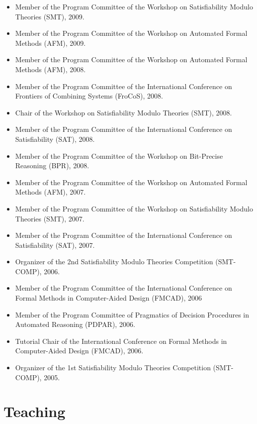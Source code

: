 \documentclass{article}
\begin{document}
\begin{itemize}
\item Member of the Program Committee of the Workshop on Satisfiability Modulo Theories (SMT), 2009.
\item Member of the Program Committee of the Workshop on Automated Formal Methods (AFM), 2009.
\item Member of the Program Committee of the Workshop on Automated Formal Methods (AFM), 2008.
\item Member of the Program Committee of the International Conference on Frontiers of Combining Systems (FroCoS), 2008.
\item Chair of the Workshop on Satisfiability Modulo Theories (SMT), 2008.
\item Member of the Program Committee of the International Conference on Satisfiability (SAT), 2008.
\item Member of the Program Committee of the Workshop on Bit-Precise Reasoning (BPR), 2008.
\item Member of the Program Committee of the Workshop on Automated Formal Methods (AFM), 2007.
\item Member of the Program Committee of the Workshop on Satisfiability Modulo Theories (SMT), 2007.
\item Member of the Program Committee of the International Conference on Satisfiability (SAT), 2007.
\item Organizer of the 2nd Satisfiability Modulo Theories Competition (SMT-COMP), 2006.
\item Member of the Program Committee of the International Conference on Formal Methods in Computer-Aided Design (FMCAD), 2006
\item Member of the Program Committee of Pragmatics of Decision Procedures in Automated Reasoning (PDPAR), 2006.
\item Tutorial Chair of the International Conference on Formal Methods in Computer-Aided Design (FMCAD), 2006.
\item Organizer of the 1st Satisfiability Modulo Theories Competition (SMT-COMP), 2005.
\end{itemize}

\section*{Teaching}
\end{document}
